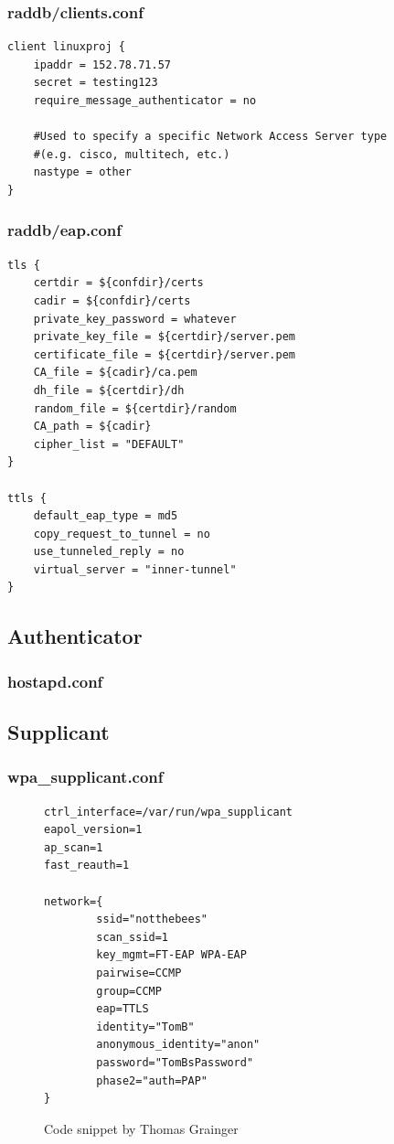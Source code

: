 \documentclass[12pt,a4paper,titlepage]{article}
\begin{document}
\subsubsection{raddb/clients.conf}
\begin{Verbatim}[frame=single]
client linuxproj {
    ipaddr = 152.78.71.57
    secret = testing123
    require_message_authenticator = no
    
    #Used to specify a specific Network Access Server type
    #(e.g. cisco, multitech, etc.)
    nastype = other
}
\end{Verbatim}

\subsubsection{raddb/eap.conf}
\begin{Verbatim}[frame=single]
tls {
    certdir = ${confdir}/certs
    cadir = ${confdir}/certs
    private_key_password = whatever
    private_key_file = ${certdir}/server.pem
    certificate_file = ${certdir}/server.pem
    CA_file = ${cadir}/ca.pem
    dh_file = ${certdir}/dh
    random_file = ${certdir}/random
    CA_path = ${cadir}
    cipher_list = "DEFAULT"
}

ttls {
    default_eap_type = md5
    copy_request_to_tunnel = no
    use_tunneled_reply = no
    virtual_server = "inner-tunnel"
}
\end{Verbatim}

\subsection{Authenticator}
\label{sec:Code;sub:authenticator}

\subsubsection{hostapd.conf}

\subsection{Supplicant}
\label{sec:Code;sub:supplicant}

\subsubsection{wpa\_supplicant.conf}
\begin{figure}[h!]
\begin{Verbatim}[frame=single]
ctrl_interface=/var/run/wpa_supplicant
eapol_version=1
ap_scan=1
fast_reauth=1

network={
        ssid="notthebees"
        scan_ssid=1
        key_mgmt=FT-EAP WPA-EAP
        pairwise=CCMP
        group=CCMP
        eap=TTLS
        identity="TomB"
        anonymous_identity="anon"
        password="TomBsPassword"
        phase2="auth=PAP"
}
\end{Verbatim}
\caption{Code snippet by Thomas Grainger}
\end{figure}
\end{document}
